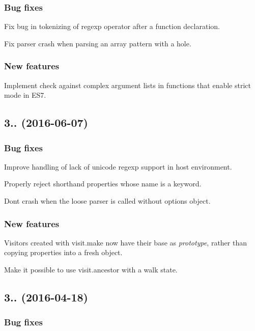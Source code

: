 \subsubsection*{Bug fixes}

Fix bug in tokenizing of regexp operator after a function declaration.

Fix parser crash when parsing an array pattern with a hole.

\subsubsection*{New features}

Implement check against complex argument lists in functions that enable strict mode in E\+S7.

\subsection*{3.. (2016-\/06-\/07)}

\subsubsection*{Bug fixes}

Improve handling of lack of unicode regexp support in host environment.

Properly reject shorthand properties whose name is a keyword.

Don\textquotesingle{}t crash when the loose parser is called without options object.

\subsubsection*{New features}

Visitors created with {\ttfamily visit.\+make} now have their base as {\itshape prototype}, rather than copying properties into a fresh object.

Make it possible to use {\ttfamily visit.\+ancestor} with a walk state.

\subsection*{3.. (2016-\/04-\/18)}

\subsubsection*{Bug fixes}

